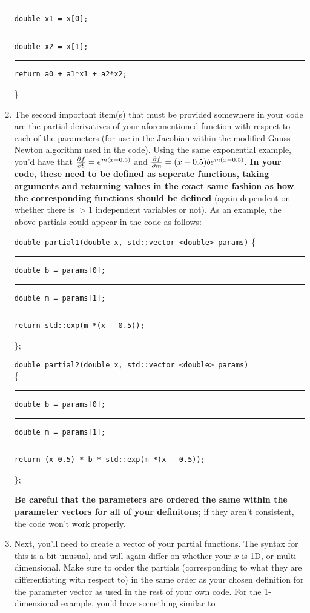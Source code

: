 \documentclass[12pt]{article}
\begin{document}
\begin{enumerate}
	\rule{1cm}{0cm}\texttt{double x1 = x[0];}
	\\\rule{1cm}{0cm}\texttt{double x2 = x[1];}
		
	\rule{1cm}{0cm}\texttt{return a0 + a1*x1 + a2*x2;}
		
	\}
	\item The second important item(s) that must be provided somewhere in your code are the partial derivatives of your aforementioned function with respect to each of the parameters (for use in the Jacobian within the modified Gauss-Newton algorithm used in the code). Using the same exponential example, you'd have that $\pdv{f}{b} = e^{m(x-0.5)}$ and $\pdv{f}{m} = (x-0.5)be^{m(x-0.5)}$. \textbf{In your code, these need to be defined as seperate functions, taking arguments and returning values in the exact same fashion as how the corresponding functions should be defined} (again dependent on whether there is $>1$ independent variables or not). As an example, the above partials could appear in the code as follows:
	
	\texttt{double partial1(double x, std::vector <double> params)}
	\{
	\\\rule{1cm}{0cm}\texttt{double b = params[0];}
	\\\rule{1cm}{0cm}\texttt{double m = params[1];}
		
	\rule{1cm}{0cm}\texttt{return std::exp(m *(x - 0.5));}
		
	\};
	
	\texttt{double partial2(double x, std::vector <double> params)}
	\\\{
	\\\rule{1cm}{0cm}\texttt{double b = params[0];}
	\\\rule{1cm}{0cm}\texttt{double m = params[1];}
		
	\rule{1cm}{0cm}\texttt{return (x-0.5) * b * std::exp(m *(x - 0.5));}
		
	\};
	
	\textbf{Be careful that the parameters are ordered the same within the parameter vectors for all of your definitons;} if they aren't consistent, the code won't work properly.
	\newpage
	\item Next, you'll need to create a vector of your partial functions. The syntax for this is a bit unusual, and will again differ on whether your $x$ is 1D, or multi-dimensional. Make sure to order the partials (corresponding to what they are differentiating with respect to) in the same order as your chosen definition for the parameter vector as used in the rest of your own code. For the 1-dimensional example, you'd have something similar to 
	

\end{enumerate}
\end{document}

